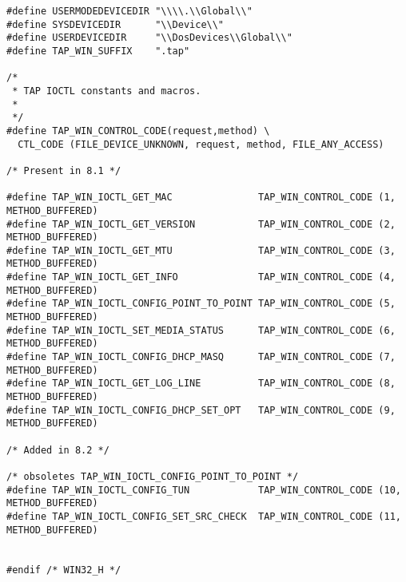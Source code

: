 \begin{lstlisting}[caption=Code von win32.h,label=lst:libstrongswan-win32.h]
#define USERMODEDEVICEDIR "\\\\.\\Global\\"
#define SYSDEVICEDIR      "\\Device\\"
#define USERDEVICEDIR     "\\DosDevices\\Global\\"
#define TAP_WIN_SUFFIX    ".tap"

/*
 * TAP IOCTL constants and macros.
 *
 */
#define TAP_WIN_CONTROL_CODE(request,method) \
  CTL_CODE (FILE_DEVICE_UNKNOWN, request, method, FILE_ANY_ACCESS)

/* Present in 8.1 */

#define TAP_WIN_IOCTL_GET_MAC               TAP_WIN_CONTROL_CODE (1, METHOD_BUFFERED)
#define TAP_WIN_IOCTL_GET_VERSION           TAP_WIN_CONTROL_CODE (2, METHOD_BUFFERED)
#define TAP_WIN_IOCTL_GET_MTU               TAP_WIN_CONTROL_CODE (3, METHOD_BUFFERED)
#define TAP_WIN_IOCTL_GET_INFO              TAP_WIN_CONTROL_CODE (4, METHOD_BUFFERED)
#define TAP_WIN_IOCTL_CONFIG_POINT_TO_POINT TAP_WIN_CONTROL_CODE (5, METHOD_BUFFERED)
#define TAP_WIN_IOCTL_SET_MEDIA_STATUS      TAP_WIN_CONTROL_CODE (6, METHOD_BUFFERED)
#define TAP_WIN_IOCTL_CONFIG_DHCP_MASQ      TAP_WIN_CONTROL_CODE (7, METHOD_BUFFERED)
#define TAP_WIN_IOCTL_GET_LOG_LINE          TAP_WIN_CONTROL_CODE (8, METHOD_BUFFERED)
#define TAP_WIN_IOCTL_CONFIG_DHCP_SET_OPT   TAP_WIN_CONTROL_CODE (9, METHOD_BUFFERED)

/* Added in 8.2 */

/* obsoletes TAP_WIN_IOCTL_CONFIG_POINT_TO_POINT */
#define TAP_WIN_IOCTL_CONFIG_TUN            TAP_WIN_CONTROL_CODE (10, METHOD_BUFFERED)
#define TAP_WIN_IOCTL_CONFIG_SET_SRC_CHECK  TAP_WIN_CONTROL_CODE (11, METHOD_BUFFERED)


#endif /* WIN32_H */
\end{lstlisting}

